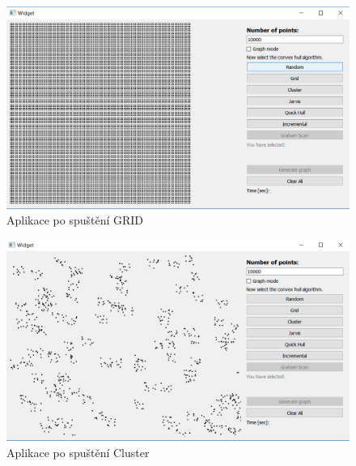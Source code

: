 \documentclass{article}
\begin{document}
\begin{figure}[htbp]
\centering
        \includegraphics[clip, trim=0cm 0cm 0cm 0cm, width=1\textwidth]{obrazek3.png}
        \caption{Aplikace po spuštění GRID}
\end{figure}
\begin{figure}[htbp]
\centering
        \includegraphics[clip, trim=0cm 0cm 0cm 0cm, width=1\textwidth]{obrazek4.png}
        \caption{Aplikace po spuštění Cluster}
\end{figure}
\clearpage
\newpage
\end{document}
